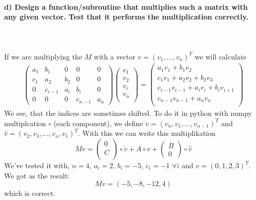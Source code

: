 \paragraph{
    d) Design a function/subroutine that multiplies such a matrix with
    any given vector. Test that it performs the multiplication correctly.
} \ \\
    \\
    If we are multiplying the $M$ with a vector $v = (v_1, \dots, v_n)^T$ we will calculate
    \begin{align}
    \begin{pmatrix}
    a_1 & b_1 & 0      & 0       & 0 \\
    c_1 & a_2 & b_2    & 0       & 0 \\
    0   & c_{i-1} & a_i & b_i    &0    \\
    0   & 0   & 0      & c_{n-1} & a_n
    \end{pmatrix}
    \begin{pmatrix}
    v_1 \\ v_2 \\v_i \\ v_n\\
    \end{pmatrix}
    =
    \begin{pmatrix}
    a_1 v_1 + b_1 v_2 \\
    c_1 v_1 + a_2 v_2 + b_2 v_3 \\
    c_{i-1} v_{i-1} + a_i v_i + b_i v_{i+1} \\
    c_{n-1} v_{n-1} + a_n v_n\\
    \end{pmatrix}
    \end{align}
    We see, that the indices are sometimes shifted. To do it in python with numpy multiplcation $\circ$ (each component), we define $\check{v} = (v_n, v_1, \dots, v_{n-1})^T$ and $\hat{v} = (v_2, v_3, \dots, v_n , v_1)^T$. With this we can write this multiplikation
    \begin{equation}
    	Mv =
    	\begin{pmatrix} 0 \\ C \\	\end{pmatrix}
    	\circ \check{v} + A \circ v +
    	\begin{pmatrix} B \\ 0	\end{pmatrix} \circ \hat{v}
    \end{equation}  
    We've tested it with, $n=4$, $a_i = 2$, $b_i = -5$, $c_i = -1$ $ \forall i$ and $v = (0,1,2,3)^T$. We got as the result:
    \begin{equation}
    	Mv = (-5, -8, -12, 4)
    \end{equation}
    which is correct.
    

